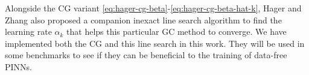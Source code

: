 Alongside the CG variant \eqref{eq:hager-cg-beta}-\eqref{eq:hager-cg-beta-hat-k}, Hager and Zhang also proposed a companion inexact line search algorithm to find the learning rate $\alpha_k$ that helps this particular GC method to converge.
We have implemented both the CG and this line search in this work.
They will be used in some benchmarks to see if they can be beneficial to the training of data-free PINNs.
